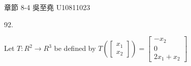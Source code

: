 \documentclass[12pt]{book}
\author{andersonwu2000}
\begin{document}
\begin{CJK}{UTF8}{bsmi}

\hfill 章節 8-4 吳至堯 U10811023


92. \begin{minipage}[t]{\dimexpr\linewidth-2em}
Let $T:R^2\rightarrow R^3$ be defined by $T\left ( \begin{bmatrix}
x_1 \\
x_2
\end{bmatrix} \right ) =\begin{bmatrix}
-x_2 \\
0 \\
2x_1+x_2
\end{bmatrix}$
\end{minipage}\\


\end{CJK}
\end{document}
